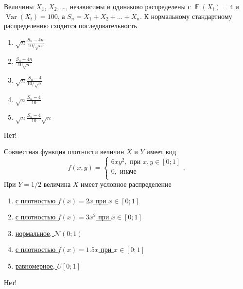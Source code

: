 \documentclass[t]{beamer}
\DeclareMathOperator{\Var}{Var}
\DeclareMathOperator{\E}{\mathbb{E}}
\newcommand{\cN}{\mathcal{N}}
\begin{document}
 \begin{frame} \label{37-No} 
\begin{block}{37} 

Величины $X_1$, $X_2$, \ldots, независимы и одинаково распределены с $\E(X_i) = 4$ и $\Var(X_i) = 100$, а $S_n = X_1 + X_2 + \ldots + X_n$. К нормальному стандартному распределению сходится последовательность
  


 \end{block} 
\begin{enumerate} 
\item[] \hyperlink{37-No}{\beamergotobutton{}  $\sqrt{n}\frac{S_n - 4n}{10/\sqrt{n}}$}
\item[] \hyperlink{37-Yes}{\beamergotobutton{}  $\frac{S_n - 4n}{10\sqrt{n}}$}
\item[] \hyperlink{37-No}{\beamergotobutton{}  $\sqrt{n}\frac{S_n - 4}{10/\sqrt{n}}$}
\item[] \hyperlink{37-No}{\beamergotobutton{}  $\sqrt{n}\frac{S_n - 4}{10}$}
\item[] \hyperlink{37-No}{\beamergotobutton{}  $\sqrt{n}\frac{S_n - 4}{10}\sqrt{n}$}
\end{enumerate} 

 \alert{Нет!} 
\end{frame} 


 \begin{frame} \label{38-No} 
\begin{block}{38} 

Совместная функция плотности величин $X$ и $Y$ имеет вид
\[
f(x,y) =
\begin{cases}
6xy^2, \text{ при } x, y \in [0;1] \\
0, \text{ иначе } \\
\end{cases}.
\]
При $Y=1/2$ величина $X$ имеет условное распределение
  


 \end{block} 
\begin{enumerate} 
\item[] \hyperlink{38-Yes}{\beamergotobutton{}  с плотностью $f(x)=2x$ при $x\in[0;1]$ }
\item[] \hyperlink{38-No}{\beamergotobutton{}  с плотностью $f(x)=3x^2$ при $x\in[0;1]$ }
\item[] \hyperlink{38-No}{\beamergotobutton{}  нормальное, $\cN(0;1)$ }
\item[] \hyperlink{38-No}{\beamergotobutton{}  с плотностью $f(x)=1.5x$ при $x\in[0;1]$ }
\item[] \hyperlink{38-No}{\beamergotobutton{}  равномерное, $U[0;1]$ }
\end{enumerate} 

 \alert{Нет!} 
\end{frame} 
\end{document}
